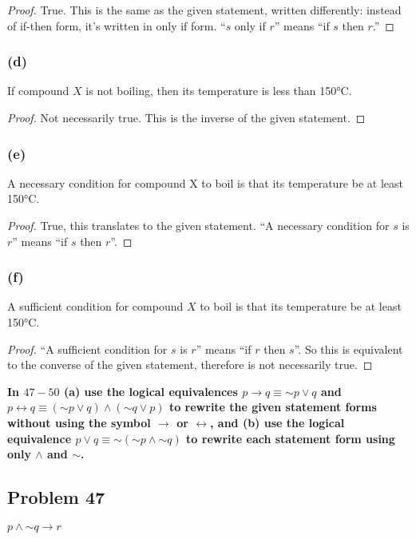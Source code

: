 \documentclass[14pt]{extarticle}
\newcommand{\bic}{\leftrightarrow}
\begin{document}
\begin{proof}
True. This is the same as the given statement, written differently: instead of
if-then form, it's written in only if form. ``$s$ only if $r$'' means ``if $s$
then $r$.''
\end{proof}

\subsubsection{(d)}
If compound $X$ is not boiling, then its temperature is less than 150°C.

\begin{proof}
Not necessarily true. This is the inverse of the given statement.
\end{proof}

\subsubsection{(e)}
A necessary condition for compound X to boil is that its temperature be at least
150°C.

\begin{proof}
True, this translates to the given statement. ``A necessary condition for $s$ is
$r$'' means ``if $s$ then $r$''.
\end{proof}

\subsubsection{(f)}
A sufficient condition for compound $X$ to boil is that its temperature be at
least 150°C.

\begin{proof}
``A sufficient condition for $s$ is $r$'' means ``if $r$ then $s$''. So this is
equivalent to the converse of the given statement, therefore is not necessarily
true.
\end{proof}

{\bf In $47-50$ (a) use the logical equivalences $p \to q \equiv {\sim p} \vee
q$ and $p \bic q \equiv ({\sim p} \vee q) \wedge ({\sim q} \vee p)$ to rewrite
the given statement forms without using the symbol $\to$ or $\bic$, and (b) use
the logical equivalence $p \vee q \equiv {\sim({\sim p} \wedge {\sim q})}$ to
rewrite each statement form using only $\wedge$ and $\sim$.}

\subsection{Problem 47}
$p \wedge {\sim q} \to r$
\end{document}
